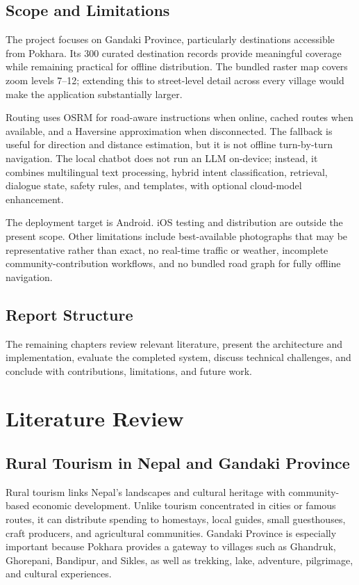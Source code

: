 \documentclass[12pt,a4paper,oneside]{report}
\begin{document}
\section{Scope and Limitations}
\label{sec:scope}

The project focuses on Gandaki Province, particularly destinations accessible from Pokhara. Its 300 curated destination records provide meaningful coverage while remaining practical for offline distribution. The bundled raster map covers zoom levels 7--12; extending this to street-level detail across every village would make the application substantially larger.

Routing uses OSRM for road-aware instructions when online, cached routes when available, and a Haversine approximation when disconnected. The fallback is useful for direction and distance estimation, but it is not offline turn-by-turn navigation. The local chatbot does not run an LLM on-device; instead, it combines multilingual text processing, hybrid intent classification, retrieval, dialogue state, safety rules, and templates, with optional cloud-model enhancement.

The deployment target is Android. iOS testing and distribution are outside the present scope. Other limitations include best-available photographs that may be representative rather than exact, no real-time traffic or weather, incomplete community-contribution workflows, and no bundled road graph for fully offline navigation.

\section{Report Structure}
\label{sec:report_structure}

The remaining chapters review relevant literature, present the architecture and implementation, evaluate the completed system, discuss technical challenges, and conclude with contributions, limitations, and future work.
\chapter{Literature Review}
\label{ch:literature}

\section{Rural Tourism in Nepal and Gandaki Province}
\label{sec:rural_tourism}

Rural tourism links Nepal's landscapes and cultural heritage with community-based economic development. Unlike tourism concentrated in cities or famous routes, it can distribute spending to homestays, local guides, small guesthouses, craft producers, and agricultural communities. Gandaki Province is especially important because Pokhara provides a gateway to villages such as Ghandruk, Ghorepani, Bandipur, and Sikles, as well as trekking, lake, adventure, pilgrimage, and cultural experiences.
\end{document}
